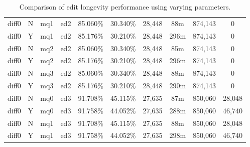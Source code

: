 \begin{sidewaystable}[!tp]
\begin{center}
\begin{tabular}{|c|c|c|c||c|c||c|c|c|c|}
diff0 & N & mq1 & ed2 & 85.060\% & 30.340\% & 28,448 & 88m & 874,143 & 0 \\
diff0 & Y & mq1 & ed2 & 85.176\% & 30.210\% & 28,448 & 296m & 874,143 & 0 \\
diff0 & N & mq2 & ed2 & 85.060\% & 30.340\% & 28,448 & 85m & 874,143 & 0 \\
diff0 & Y & mq2 & ed2 & 85.176\% & 30.210\% & 28,448 & 296m & 874,143 & 0 \\
diff0 & N & mq3 & ed2 & 85.060\% & 30.340\% & 28,448 & 88m & 874,143 & 0 \\
diff0 & Y & mq3 & ed2 & 85.176\% & 30.210\% & 28,448 & 290m & 874,143 & 0 \\
diff0 & N & mq0 & ed3 & 91.708\% & 45.115\% & 27,635 & 87m & 850,060 & 28,048 \\
diff0 & Y & mq0 & ed3 & 91.758\% & 44.052\% & 27,635 & 288m & 850,060 & 46,740 \\
diff0 & N & mq1 & ed3 & 91.708\% & 45.115\% & 27,635 & 88m & 850,060 & 28,048 \\
diff0 & Y & mq1 & ed3 & 91.758\% & 44.052\% & 27,635 & 298m & 850,060 & 46,740 \\
\hline
\end{tabular}
\end{center}
\caption{Comparison of edit longevity performance using
    varying parameters.}
\end{sidewaystable}

